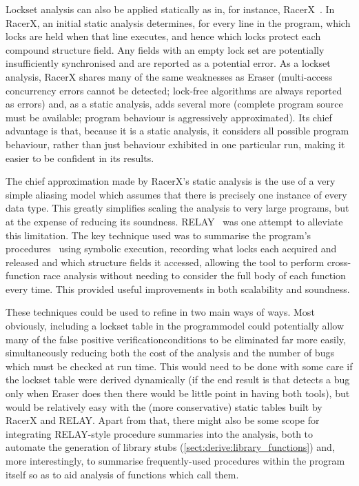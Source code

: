 Lockset analysis can also be applied statically as in, for instance,
RacerX~\cite{Engler2003}.  In RacerX, an initial static analysis
determines, for every line in the program, which locks are held when
that line executes, and hence which locks protect each compound
structure field.  Any fields with an empty lock set are potentially
insufficiently synchronised and are reported as a potential error.  As
a lockset analysis, RacerX shares many of the same weaknesses as
Eraser (multi-access concurrency errors cannot be detected; lock-free
algorithms are always reported as errors) and, as a static analysis,
adds several more (complete program source must be available; program
behaviour is aggressively approximated).  Its chief advantage is that,
because it is a static analysis, it considers all possible program
behaviour, rather than just behaviour exhibited in one particular run,
making it easier to be confident in its results.

 The chief approximation made by RacerX's static
analysis is the use of a very simple aliasing model which assumes that
there is precisely one instance of every data type.  This greatly
simplifies scaling the analysis to very large programs, but at the
expense of reducing its soundness.  RELAY~\cite{Voung2007} was one
attempt to alleviate this limitation.  The key technique used was to
summarise the program's procedures~\cite{Qadeer2004} using symbolic
execution, recording what locks each acquired and released and which
structure fields it accessed, allowing the tool to perform
cross-function race analysis without needing to consider the full body
of each function every time.  This provided useful improvements in
both scalability and soundness.

 These techniques could be used to
refine {\technique} in two main ways of ways.  Most obviously,
including a lockset table in the \gls{programmodel} could potentially
allow many of the false positive \glspl{verificationcondition} to be
eliminated far more easily, simultaneously reducing both the cost of
the analysis and the number of bugs which must be checked at run time.
This would need to be done with some care if the lockset table were
derived dynamically (if the end result is that {\technique} detects a
bug only when Eraser does then there would be little point in having
both tools), but would be relatively easy with the (more conservative)
static tables built by RacerX and RELAY.  Apart from that, there might
also be some scope for integrating RELAY-style procedure summaries
into the {\technique} analysis, both to automate the generation of
library stubs (\autoref{sect:derive:library_functions}) and, more
interestingly, to summarise frequently-used procedures within the
program itself so as to aid analysis of functions which call them.

